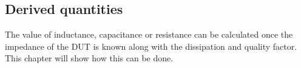 \subsection{Derived quantities} \label{subsec:DerivedQuantities}
The value of inductance, capacitance or resistance can be calculated once the impedance of the DUT is known along with the dissipation and quality factor. This chapter will show how this can be done.

